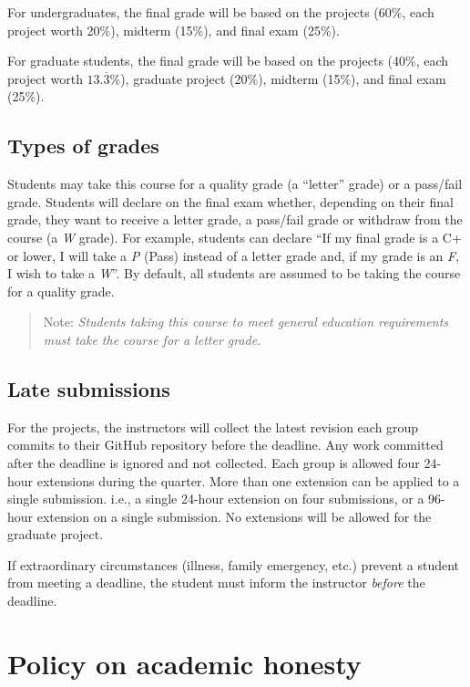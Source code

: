 \documentclass[11pt]{article}
\begin{document}
For undergraduates, the final grade will be based on the projects (60\%, each project worth 20\%), midterm (15\%), and final exam (25\%).

For graduate students, the final grade will be based on the projects (40\%, each project worth $13.\overline{3}$\%), graduate project (20\%), midterm (15\%), and final exam (25\%).

\subsection{Types of grades}

Students may take this course for a quality grade (a ``letter'' grade) or a pass/fail grade. Students will declare on the final exam whether, depending on their final grade, they want to receive a letter grade, a pass/fail grade or withdraw from the course (a \emph{W} grade). For example, students can declare ``If my final grade is a C+ or lower, I will take a \emph{P} (Pass) instead of a letter grade and, if my grade is an \emph{F}, I wish to take a \emph{W}''. By default, all students are assumed to be taking the course for a quality grade.

\begin{quote}
Note: \emph{Students taking this course to meet general education requirements must take the course for a letter grade}. 
\end{quote}


\subsection{Late submissions}

For the projects, the instructors will collect the latest revision each group commits to their GitHub repository before the deadline. Any work committed after the deadline is ignored and not collected. Each group is allowed four 24-hour extensions during the quarter. More than one extension can be applied to a single submission. i.e., a single 24-hour extension on four submissions, or a 96-hour extension on a single submission. No extensions will be allowed for the graduate project.

If extraordinary circumstances (illness, family emergency, etc.) prevent a student from meeting a deadline, the student must inform the instructor \emph{before} the deadline.


\section{Policy on academic honesty}
\end{document}
